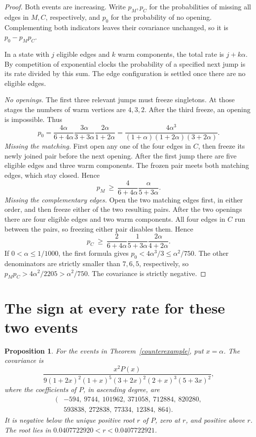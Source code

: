 \documentclass[11pt,a4paper]{amsart}
\newtheorem{proposition}[theorem]{Proposition}
\begin{document}
\begin{proof}
Both events are increasing. Write \(p_M,p_C\) for the probabilities of missing all edges in \(M,C\), respectively, and \(p_0\) for the probability of no opening. Complementing both indicators leaves their covariance unchanged, so it is \(p_0-p_Mp_C\).

In a state with \(j\) eligible edges and \(k\) warm components, the total rate is \(j+k\alpha\). By competition of exponential clocks the probability of a specified next jump is its rate divided by this sum. The edge configuration is settled once there are no eligible edges.

\emph{No openings.} The first three relevant jumps must freeze singletons. At those stages the numbers of warm vertices are \(4,3,2\). After the third freeze, an opening is impossible. Thus
\[
p_0=\frac{4\alpha}{6+4\alpha}\frac{3\alpha}{3+3\alpha}
       \frac{2\alpha}{1+2\alpha}
    =\frac{4\alpha^3}{(1+\alpha)(1+2\alpha)(3+2\alpha)}.
\]
\emph{Missing the matching.} First open any one of the four edges in \(C\), then freeze its newly joined pair before the next opening. After the first jump there are five eligible edges and three warm components. The frozen pair meets both matching edges, which stay closed. Hence
\[
p_M\ \geq\ \frac{4}{6+4\alpha}\frac{\alpha}{5+3\alpha}.
\]
\emph{Missing the complementary edges.} Open the two matching edges first, in either order, and then freeze either of the two resulting pairs. After the two openings there are four eligible edges and two warm components. All four edges in \(C\) run between the pairs, so freezing either pair disables them. Hence
\[
p_C\ \geq\ \frac{2}{6+4\alpha}\frac{1}{5+3\alpha}
                 \frac{2\alpha}{4+2\alpha}.
\]
If \(0<\alpha\leq 1/1000\), the first formula gives \(p_0<4\alpha^3/3\leq\alpha^2/750\). The other denominators are strictly smaller than \(7,6,5\), respectively, so \(p_Mp_C>4\alpha^2/2205>\alpha^2/750\). The covariance is strictly negative.
\end{proof}

\section{The sign at every rate for these two events}
\begin{proposition}\label{threshold}
For the events in Theorem~\ref{counterexample}, put \(x=\alpha\). The covariance is
\[
\frac{x^2P(x)}{9(1+2x)^2(1+x)^5(3+2x)^2(2+x)^3(5+3x)^2},
\]
where the coefficients of \(P\), in ascending degree, are
\[
\begin{split}
(&-594,\ 9744,\ 101962,\ 371058,\ 712884,\ 820280,\\
 &593838,\ 272838,\ 77334,\ 12384,\ 864).
\end{split}
\]
It is negative below the unique positive root \(r\) of \(P\), zero at \(r\), and positive above \(r\). The root lies in
\(0.0407722920<r<0.0407722921\).
\end{proposition}
\end{document}
